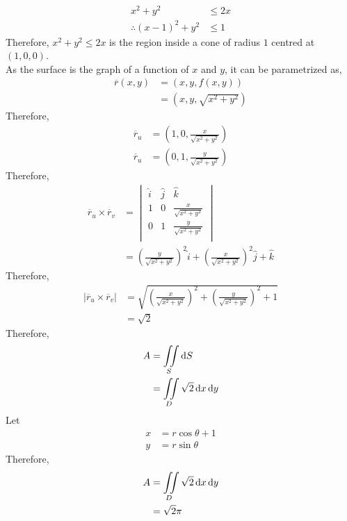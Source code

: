 \documentclass[fleqn, a4paper, 12pt, twoside]{article}
\theoremstyle{definition}
\theoremstyle{theorem}
\begin{document}
\begin{solution}
	\begin{align*}
		x^2 + y^2                  & \le 2 x \\
		\therefore (x - 1)^2 + y^2 & \le 1
	\end{align*}
	Therefore, $x^2 + y^2 \le 2 x$ is the region inside a cone of radius $1$ centred at $(1,0,0)$.\\
	As the surface is the graph of a function of $x$ and $y$, it can be parametrized as,
	\begin{align*}
		\overline{r}(x,y) & = \left( x , y , f(x,y) \right) \\
                                  & = \left( x , y , \sqrt{x^2 + y^2} \right)
	\end{align*}
	Therefore,
	\begin{align*}
		\overline{r}_u & = \left( 1 , 0 , \frac{x}{\sqrt{x^2 + y^2}} \right) \\
		\overline{r}_u & = \left( 0 , 1 , \frac{y}{\sqrt{x^2 + y^2}} \right)
	\end{align*}
	Therefore,
	\begin{align*}
		\overline{r}_u \times \overline{r}_v &=
			\begin{vmatrix}
				\hat{i} & \hat{j} & \hat{k}                    \\
				1       & 0       & \frac{x}{\sqrt{x^2 + y^2}} \\
				0       & 1       & \frac{y}{\sqrt{x^2 + y^2}} \\
			\end{vmatrix}\\
		&= \left( \frac{y}{\sqrt{x^2 + y^2}} \right)^2 \hat{i} + \left( \frac{x}{\sqrt{x^2 + y^2}} \right)^2 \hat{j} + \hat{k}
	\end{align*}
	Therefore,
	\begin{align*}
		\left| \overline{r}_u \times \overline{r}_v \right| & = \sqrt{\left( \frac{x}{\sqrt{x^2 + y^2}} \right)^2 + \left( \frac{y}{\sqrt{x^2 + y^2}} \right)^2 + 1} \\
                                                                    & = \sqrt{2}
	\end{align*}
	Therefore,
	\begin{align*}
		A & = \iint\limits_{S} \dif S \\
                  & = \iint\limits_{D} \sqrt{2} \dif x \dif y
	\end{align*}
	Let
	\begin{align*}
		x & = r \cos \theta + 1 \\
		y & = r \sin \theta
	\end{align*}
	Therefore,
	\begin{align*}
		A & = \iint\limits_{D} \sqrt{2} \dif x \dif y \\
                  & = \sqrt{2} \pi
	\end{align*}
\end{solution}
\end{document}
